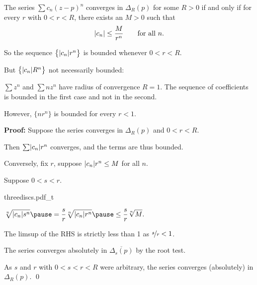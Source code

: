 \documentclass[10pt,aspectratio=169]{beamer}
\begin{document}
\begin{frame}

\begin{proposition}
The series $\sum c_n {(z-p)}^n$ converges in $\Delta_{R}(p)$ for some
$R > 0$ if and only if
for every $r$ with
$0 < r < R$, there exists an $M > 0$ such that
\begin{equation*}
\lvert {c_n} \rvert \leq \frac{M}{r^n} \qquad \text{for all } n .
\end{equation*}
\end{proposition}

\pause
So the sequence
$\bigl\{ \lvert {c_n} \rvert r^n \bigr\}$ is bounded whenever $0 < r < R$.

\medskip
\pause

But $\bigl\{ \lvert {c_n} \rvert R^n \bigr\}$ not necessarily bounded:

\medskip
\pause

$\sum z^n$ and $\sum n z^n$ have
radius of convergence $R=1$.
\pause The sequence of coefficients
is bounded in the first case and
not in the second.

\medskip
\pause

However, $\{ n r^n \}$ is bounded for every $r < 1$.
\end{frame}

\begin{frame}

\textbf{Proof:}
Suppose the series converges in $\Delta_{R}(p)$ and
$0 < r < R$. 

\medskip
\pause
Then $\sum \lvert {c_n} \rvert r^n$ converges, and the terms are thus bounded.

\medskip
\pause

Conversely, fix $r$, suppose 
$\lvert {c_n} \rvert r^n \leq M$ for all $n$.

\medskip
\pause

Suppose $0 < s < r$.

\vspace*{-0.6in}
\hspace*{3.5in}%
{threediscs.pdf_t}

\pause

\vspace*{-0.7in}

\qquad
$\displaystyle
\sqrt[n]{\sabs{c_n} s^n} \pause =
\frac{s}{r}\sqrt[n]{\sabs{c_n} r^n} \pause
\leq \frac{s}{r} \sqrt[n]{M} .
$

\medskip
\pause

The limsup of the RHS is strictly less than 1 as $\nicefrac{s}{r} < 1$.

\medskip
\pause

The series converges absolutely in
$\overline{\Delta_s(p)}$ by the root test.

\medskip
\pause

As $s$ and $r$ with $0 < s < r < R$ were arbitrary,
the series converges (absolutely) in $\Delta_R(p)$.
\qed
\end{frame}
\end{document}
